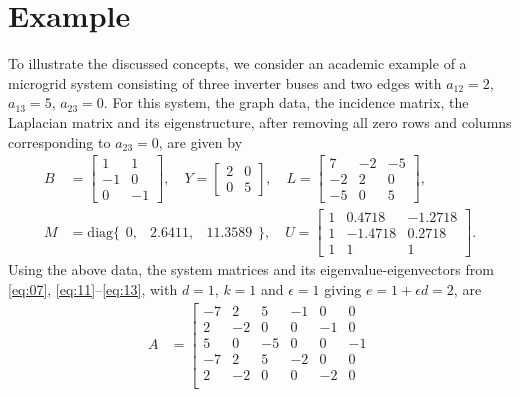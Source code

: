 \documentclass[letter, 10pt, conference]{ieeeconf}
\newcommand{\diag}{\mathrm{diag}}
\newcommand{\1}{\mathbf{1}}
\newcommand{\0}{\mathbf{0}}
\begin{document}
{\section{Example}
To illustrate the discussed concepts, we consider an academic example of
a microgrid system consisting of three inverter buses and two edges with $a_{12}=2$,
$a_{13}=5$, $a_{23}=0$. For this system, the graph data, the
incidence matrix, the Laplacian matrix and its eigenstructure, after
removing all zero rows and columns corresponding to $a_{23}=0$, are
given by
\begin{align*}
B &= \left[\begin{smallmatrix}
		 1 & 1 \\ -1 & 0 \\ 0 & -1
	\end{smallmatrix}\right],  \quad
	Y = \left[\begin{smallmatrix}
		 2 & 0 \\ 0 & 5
	\end{smallmatrix}\right],\quad
	L = \left[\begin{smallmatrix}
		 7 & -2 & -5 \\
    	-2 &  2 &  0 \\
    	-5 &  0 &  5
	\end{smallmatrix}\right], \\[2mm]
	M &= \diag\{\begin{smallmatrix}
		0, & 2.6411, & 11.3589 
		\end{smallmatrix}\}, \quad
	U =\left[\begin{smallmatrix}
		1 &   0.4718  & -1.2718 \\
    	1 &  -1.4718  &  0.2718 \\
    	1 &   1       &  1
	\end{smallmatrix}\right].
\end{align*}
Using the above data, the system matrices and its eigenvalue-eigenvectors
from \eqref{eq:07}, \eqref{eq:11}--\eqref{eq:13}, with $d=1$, $k=1$ 
and $\epsilon=1$ giving $e=1+\epsilon d=2$, are
\begin{align*}
	A  &= \left[\begin{smallmatrix}
	-7  &   2  &   5  &  -1  &   0  &   0\\
     2  &  -2  &   0  &   0  &  -1  &   0\\
     5  &   0  &  -5  &   0  &   0  &  -1\\
    -7  &   2  &   5  &  -2  &   0  &   0\\
     2  &  -2  &   0  &   0  &  -2  &   0\\

\end{smallmatrix}
\end{align*}}
\end{document}
